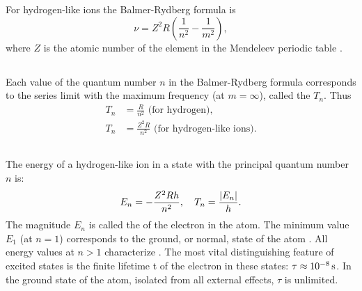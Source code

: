 For hydrogen-like ions  the Balmer-Rydberg formula is
\begin{equation*}%
\nu = Z^{2}R \left( \frac{1}{n^{2}} - \frac{1}{m^{2}} \right),
\end{equation*}
where $Z$ is the atomic number of the element in the Mendeleev periodic table .


\subsection{}\label{39.1.4} Each value of the quantum number $n$ in the Balmer-Rydberg formula corresponds to the series limit with the maximum frequency (at $m = \infty$), called the  $T_{n}$. Thus
\begin{align*}%
T_{n} & = \frac{R}{n^{2}} \text{ (for hydrogen),}\\
T_{n} & = \frac{Z^{2}R}{n^{2}} \text{ (for hydrogen-like ions).}
\end{align*}

\subsection{}\label{39.1.5} The energy of a hydrogen-like ion in a state with the principal quantum number $n$ is:
\begin{equation*}%
E_{n} = - \frac{Z^{2}Rh}{n^{2}}, \quad T_{n} = \frac{\abs{E_{n}}}{h}.
\end{equation*}
The magnitude $E_{n}$ is called the  of the electron in the atom. The minimum value $E_{1}$ (at $n = 1$) corresponds to the ground, or normal, state of the atom . All energy values at $n > 1$ characterize . The most vital distinguishing feature of excited states is the finite lifetime t of the electron in these states: $\tau \approx \SI{d-8}{\second}$. In the ground state of the atom, isolated from all external effects, $\tau$ is unlimited.

